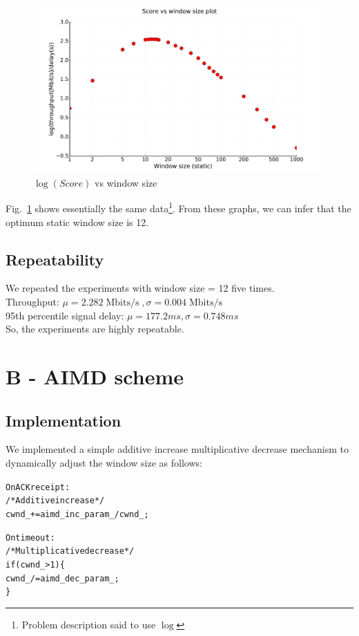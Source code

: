 \documentclass{article}
\DeclareMathOperator{\mbps}{Mbits/s}
\begin{document}
\begin{figure}[h]
\includegraphics[width=\columnwidth]{"../A/A-score-log"}
\caption{$\log(Score)$ vs window size}
\label{A-score-log}
\end{figure}

Fig.~\ref{A-score-log} shows essentially the same
data\footnote{Problem description said to use $\log$}. From these
graphs, we can infer that the optimum static window size is 12.

\subsection{Repeatability}
We repeated the experiments with window size = 12 five times.\\
Throughput: $\mu = 2.282 \mbps, \sigma = 0.004 \mbps$ \\
95th percentile signal delay: $\mu = 177.2 ms, \sigma = 0.748 ms$\\
So, the experiments are highly repeatable.

\clearpage
\section{B - AIMD scheme}
\subsection{Implementation}
We implemented a simple additive increase multiplicative decrease
mechanism to dynamically adjust the window size as follows:
\begin{alltt}
  On ACK receipt:
    /* Additive increase */
    cwnd_ += aimd_inc_param_/cwnd_;

  On timeout:
    /* Multiplicative decrease */
    if (cwnd_ > 1) \{
      cwnd_ /= aimd_dec_param_;
    \}
\end{alltt}
\end{document}
